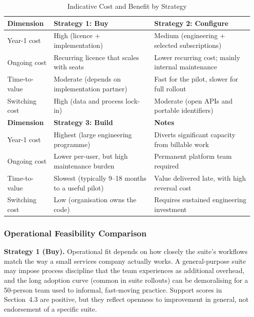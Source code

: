 \documentclass[12pt,a4paper]{report}
\begin{document}
\begin{table}[H]
\centering
\caption{Indicative Cost and Benefit by Strategy}
\label{tab:cost-comparison}
\small
\renewcommand{\arraystretch}{1.18}
\begin{tabularx}{\textwidth}{>{\raggedright\arraybackslash}p{3.2cm}
                                >{\raggedright\arraybackslash}X
                                >{\raggedright\arraybackslash}X}
\toprule
\textbf{Dimension} & \textbf{Strategy 1: Buy} & \textbf{Strategy 2: Configure} \\
\midrule
Year-1 cost & High (licence + implementation) & Medium (engineering + selected subscriptions) \\
Ongoing cost & Recurring licence that scales with seats & Lower recurring cost; mainly internal maintenance \\
Time-to-value & Moderate (depends on implementation partner) & Fast for the pilot, slower for full rollout \\
Switching cost & High (data and process lock-in) & Moderate (open APIs and portable identifiers) \\
\midrule
\textbf{Dimension} & \textbf{Strategy 3: Build} & \textbf{Notes} \\
\midrule
Year-1 cost & Highest (large engineering programme) & Diverts significant capacity from billable work \\
Ongoing cost & Lower per-user, but high maintenance burden & Permanent platform team required \\
Time-to-value & Slowest (typically 9--18 months to a useful pilot) & Value delivered late, with high reversal cost \\
Switching cost & Low (organisation owns the code) & Requires sustained engineering investment \\
\bottomrule
\end{tabularx}
\end{table}

\subsubsection{Operational Feasibility Comparison}
\label{sec:operational-comparison}

\textbf{Strategy 1 (Buy).} Operational fit depends on how closely the suite's workflows match
the way a small services company actually works. A general-purpose suite may impose process
discipline that the team experiences as additional overhead, and the long adoption curve
(common in suite rollouts) can be demoralising for a 50-person team used to informal,
fast-moving practice. Support scores in Section~4.3 are positive, but they reflect openness
to improvement in general, not endorsement of a specific suite.
\end{document}

